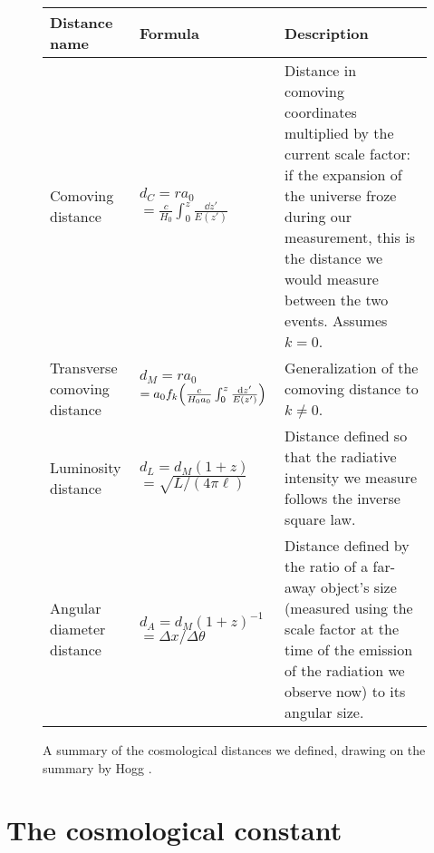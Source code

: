 \documentclass[main.tex]{subfiles}
\begin{document}
\begin{figure}
\begin{tabular}{p{2.5cm}p{5cm}p{7cm}}
Distance name & Formula & Description\\
\hline
Comoving \newline distance  & \(d_C = r a_0\) \newline \( = \frac{c}{H_0 }\int_{0}^{z} \frac{ \dd{z'}}{E(z')}\) & Distance in comoving coordinates multiplied by the current scale factor: if the expansion of the universe froze during our measurement, this is the distance we would measure between the two events. Assumes \(k=0\). \\ \hline
Transverse \newline comoving \newline  distance  & \(d_M = r a_0\) \newline \( = a_0 f_k \qty(\frac{c}{H_0 a_0  }\int_{0}^{z} \frac{ \dd{z'}}{E(z')})\) & Generalization of the comoving distance to \(k \neq 0\). \\ \hline
Luminosity \newline  distance  & \(d_L = d_M (1+z)\)
\newline \(= \sqrt{L / (4 \pi \ell)}\) & Distance defined so that the radiative intensity we measure follows the inverse square law. \\ \hline
Angular \newline diameter \newline  distance  & \(d_A = d_M (1+z)^{-1}\)
\newline \(= \Delta x / \Delta \theta \) & Distance defined by the ratio of a far-away object's size (measured using the scale factor at the time of the emission of the radiation we observe now) to its angular size.
\end{tabular}
\label{tab:cosmological-distances}
\caption{A summary of the cosmological distances we defined, drawing on the summary by Hogg \cite[]{hoggDistanceMeasuresCosmology2000}.}
\end{figure}

\section{The cosmological constant} \label{sec:cosmological-constant}
\end{document}
